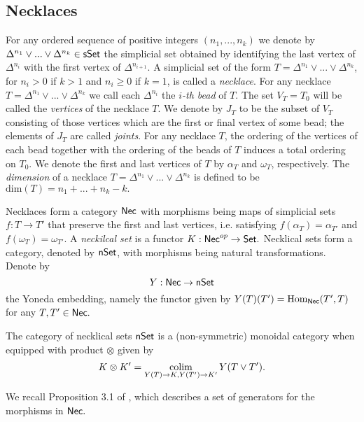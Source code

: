 
\subsection{Necklaces} For any ordered sequence of positive integers $(n_1,...,n_k)$ we denote by $\Delta^{n_1} \vee...\vee \Delta^{n_k} \in \mathsf{sSet}$ the simplicial set obtained by identifying the last vertex of $\Delta^{n_i}$ with the first vertex of $\Delta^{n_{i+1}}.$ A simplicial set of the form $T=\Delta^{n_1} \vee...\vee \Delta^{n_k}$, for $n_i>0$ if $k>1$ and $n_i \geq 0$ if $k=1$, is called a \textit{necklace}. For any necklace $T= \Delta^{n_1} \vee...\vee \Delta^{n_k}$ we call each $\Delta^{n_i}$ the \textit{$i$-th bead} of $T$. The set $V_T=T_0$ will be called the \textit{vertices} of the necklace $T$. We denote by $J_T$ to be the subset of $V_T$ consisting of those vertices which are the first or final vertex of some bead; the elements of $J_T$ are called \textit{joints}. For any necklace $T$, the ordering of the vertices of each bead together with the ordering of the beads of $T$ induces a total ordering on $T_0.$ We denote the first and last vertices of $T$ by $\alpha_T$ and $\omega_T$, respectively. The \textit{dimension} of a necklace $T=\Delta^{n_1} \vee...\vee \Delta^{n_k}$ is defined to be $\text{dim}(T)=n_1 + ... +n_k-k.$

Necklaces form a category $\mathsf{Nec}$ with morphisms being maps of simplicial sets $f: T \to T'$ that preserve the first and last vertices, i.e. satisfying $f(\alpha_T)=\alpha_{T'}$ and $f(\omega_T)=\omega_{T'}.$ A \textit{neckilcal set} is a functor $K: \mathsf{Nec}^{op} \to \mathsf{Set}.$ Necklical sets form a category, denoted by $\mathsf{nSet}$, with morphisms being natural transformations. Denote by $$Y: \mathsf{Nec} \to \mathsf{nSet}$$ the Yoneda embedding, namely the functor given by $Y(T)(T')= \text{Hom}_{\mathsf{Nec}}(T',T)$ for any $T,T' \in \mathsf{Nec}.$

The category of necklical sets $\mathsf{nSet}$ is a (non-symmetric) monoidal category when equipped with product $\otimes$ given by $$K \otimes K' = \operatorname*{colim}_{Y(T) \to K, Y(T')\to K'} Y(T \vee T').$$

We recall Proposition 3.1 of \cite{Rivera and Zeinalian, cubical rigidification}, which describes a set of generators for the morphisms in $\mathsf{Nec}.$

